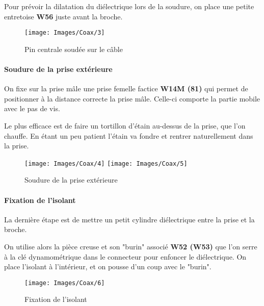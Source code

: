 Pour prévoir la dilatation du diélectrique lors de la soudure, on place une petite entretoise \textbf{W56} juste avant la broche.
\begin{figure}[h]
    \begin{center}
        \texttt{[image: Images/Coax/3]}
        \caption{Pin centrale soudée sur le câble}
        \label{coax_soudure_centre}
    \end{center}
\end{figure}


\paragraph*{Soudure de la prise extérieure} On fixe sur la prise mâle une prise femelle factice \textbf{W14M (81)} qui permet de positionner à la distance correcte la prise mâle. Celle-ci comporte la partie mobile avec le pas de vis.

Le plus efficace est de faire un tortillon d'étain au-dessus de la prise, que l'on chauffe. En étant un peu patient l'étain va fondre et rentrer naturellement dans la prise.

\begin{figure}[ht]
    \begin{center}
        \texttt{[image: Images/Coax/4]}
        \quad
        \texttt{[image: Images/Coax/5]}
        \caption{Soudure de la prise extérieure}
        \label{coax_soudure_exterieur}
    \end{center}
\end{figure}


\newpage
\paragraph*{Fixation de l’isolant}  La dernière étape est de mettre un petit cylindre diélectrique entre la prise et la broche.

On utilise alors la pièce creuse et son "burin" associé \textbf{W52 (W53)} que l'on serre à la clé dynamométrique dans le connecteur pour enfoncer le diélectrique. On place l'isolant à l'intérieur, et on pousse d'un coup avec le "burin".
\begin{figure}[ht]
    \begin{center}
        \texttt{[image: Images/Coax/6]}
        \caption{Fixation de l’isolant}
        \label{coax_fixation_isolant}
    \end{center}
\end{figure}



